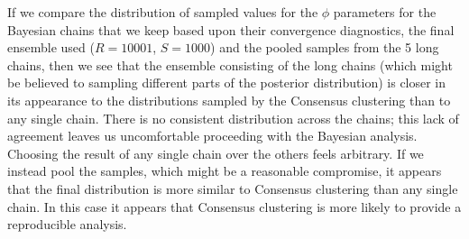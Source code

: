 \documentclass[]{article}
\begin{document}

If we compare the distribution of sampled values for the $\phi$ parameters for the Bayesian chains that we keep based upon their convergence diagnostics, the final ensemble used ($R=10001$, $S=1000$) and the pooled samples from the 5 long chains, then we see that the ensemble consisting of the long chains (which might be believed to sampling different parts of the posterior distribution) is closer in its appearance to the distributions sampled by the Consensus clustering than to any single chain. There is no consistent distribution across the chains; this lack of agreement leaves us uncomfortable proceeding with the Bayesian analysis. Choosing the result of any single chain over the others feels arbitrary. If we instead pool the samples, which might be a reasonable compromise, it appears that the final distribution is more similar to Consensus clustering than any single chain. In this case it appears that Consensus clustering is more likely to provide a reproducible analysis. 

\end{document}
